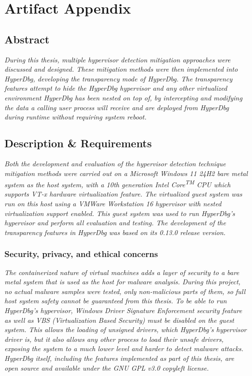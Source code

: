 
\section{Artifact Appendix}

\subsection{Abstract}
{\em During this thesis, multiple hypervisor detection mitigation approaches were discussed and designed. These mitigation methods were then implemented into HyperDbg, 
developing the transparency mode of HyperDbg. The transparency features attempt to hide the HyperDbg hypervisor and any other virtualized environment HyperDbg has been nested on top of, 
by intercepting and modifying the data a calling user process will receive and are deployed from HyperDbg during runtime without requiring system reboot.}

\subsection{Description \& Requirements}

\textit{Both the development and evaluation of the hypervisor detection technique mitigation methods were carried out
on a Microsoft Windows 11 24H2 bare metal system as the host system, with a 10th generation Intel Core\textsuperscript{TM} CPU which supports VT-x hardware virtualization feature.
The virtualized guest system was run on this host using a VMWare Workstation 16 hypervisor with nested virtualization support enabled.
This guest system was used to run HyperDbg's hypervisor and perform all evaluation and testing. The development of the transparency features in HyperDbg was based on its 0.13.0 release version. }

\subsubsection{Security, privacy, and ethical concerns}
\textit{The containerized nature of virtual machines adds a layer of security to a bare metal system that is used as the host for malware analysis.
During this project, no actual malware samples were tested, only non-malicious parts of them, so full host system safety cannot be guaranteed from this thesis.
To be able to run HyperDbg's hypervisor, Windows Driver Signature Enforcement security feature as well as VBS (Virtualization Based Security) must be disabled on the guest system.
This allows the loading of unsigned drivers, which HyperDbg's hypervisor driver is, but it also allows any other process to load their unsafe drivers, 
exposing the system to a much lower level and harder to detect malware attacks. HyperDbg itself, including the features implemented as part of this thesis, are open source and available under the GNU GPL v3.0 copyleft license.}

